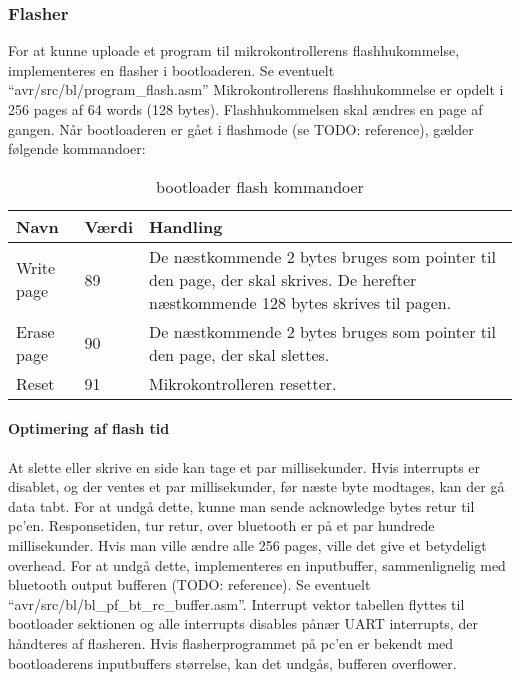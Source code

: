 \subsubsection{Flasher}
For at kunne uploade et program til mikrokontrollerens flashhukommelse, implementeres en flasher i bootloaderen.
Se eventuelt ``avr/src/bl/program\_flash.asm''
Mikrokontrollerens flashhukommelse er opdelt i 256 pages af 64 words (128 bytes). Flashhukommelsen skal ændres en page af gangen.
Når bootloaderen er gået i flashmode (se TODO: reference), gælder følgende kommandoer:
\begin{table}[H]
	\caption{bootloader flash kommandoer}
	\label{tab:blflashcommands}
	\centering
	\begin{tabular}{|l|l|p{13cm}|}
		\hline
		\textbf{Navn} & \textbf{Værdi} & \textbf{Handling} \\
		\hline
		Write page & 89 & De næstkommende 2 bytes bruges som pointer til den page, der skal skrives. De herefter næstkommende 128 bytes skrives til pagen.\\
		\hline
		Erase page & 90 & De næstkommende 2 bytes bruges som pointer til den page, der skal slettes.\\
		\hline
		Reset & 91 & Mikrokontrolleren resetter.\\
		\hline
	\end{tabular}
\end{table}
\paragraph{Optimering af flash tid}
At slette eller skrive en side kan tage et par millisekunder. Hvis interrupts er disablet, og der ventes et par millisekunder, før næste byte modtages, kan der gå data tabt. For at undgå dette, kunne man sende acknowledge bytes retur til pc'en. Responsetiden, tur retur, over bluetooth er på et par hundrede millisekunder. Hvis man ville ændre alle 256 pages, ville det give et betydeligt overhead.
For at undgå dette, implementeres en inputbuffer, sammenlignelig med bluetooth output bufferen (TODO: reference). Se eventuelt ``avr/src/bl/bl\_pf\_bt\_rc\_buffer.asm''. Interrupt vektor tabellen flyttes til bootloader sektionen og alle interrupts disables pånær UART interrupts, der håndteres af flasheren. Hvis flasherprogrammet på pc'en er bekendt med bootloaderens inputbuffers størrelse, kan det undgås, bufferen overflower.
